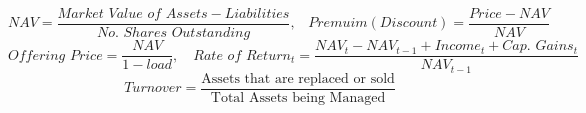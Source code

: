 $$NAV = \frac{Market \,\, Value \,\, of \,\, Assets - Liabilities}{No. \,\, Shares \,\, Outstanding}, \,\,\,\,\, Premuim(Discount) = \frac{Price - NAV}{NAV}$$
$$Offering \,\, Price = \frac{NAV}{1-load}, \,\,\,\,\,\, Rate \,\, of \,\, Return_{t} = \frac{NAV_{t} - NAV_{t-1} + Income_{t} + Cap. \,\, Gains_{t}}{NAV_{t-1}}$$
$$Turnover = \frac{\textrm{Assets that are replaced or sold}}{\textrm{Total Assets being Managed}}$$